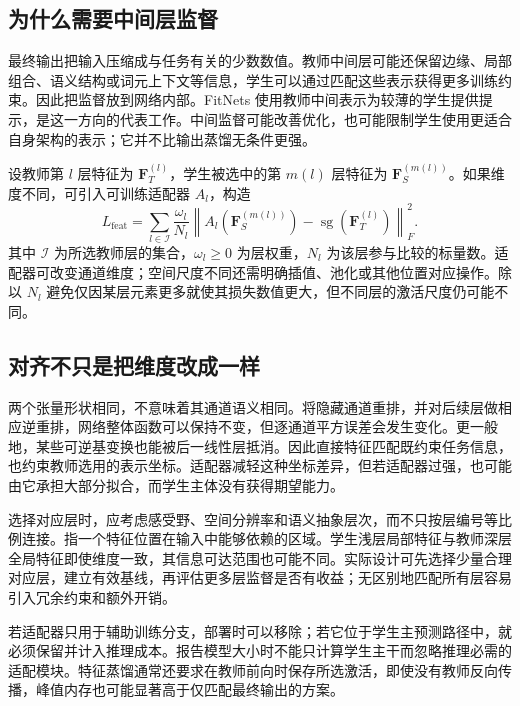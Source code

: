 \documentclass[UTF8,12pt,a4paper,fontset=fandol]{ctexart}
\begin{document}
\subsection{为什么需要中间层监督}
最终输出把输入压缩成与任务有关的少数数值。教师中间层可能还保留边缘、局部组合、语义结构或词元上下文等信息，学生可以通过匹配这些表示获得更多训练约束。因此把监督放到网络内部。FitNets 使用教师中间表示为较薄的学生提供提示，是这一方向的代表工作\cite{romero2015}。中间监督可能改善优化，也可能限制学生使用更适合自身架构的表示；它并不比输出蒸馏无条件更强。

设教师第 $l$ 层特征为 $\mathbf F_T^{(l)}$，学生被选中的第 $m(l)$ 层特征为 $\mathbf F_S^{(m(l))}$。如果维度不同，可引入可训练适配器 $A_l$，构造
\begin{equation}
 L_{\mathrm{feat}}=\sum_{l\in\mathcal I}\frac{\omega_l}{N_l}
 \left\|A_l(\mathbf F_S^{(m(l))})-
       \operatorname{sg}(\mathbf F_T^{(l)})\right\|_F^2.
 \label{eq:kd-feature-loss}
\end{equation}
其中 $\mathcal I$ 为所选教师层的集合，$\omega_l\geq0$ 为层权重，$N_l$ 为该层参与比较的标量数。适配器可改变通道维度；空间尺度不同还需明确插值、池化或其他位置对应操作。除以 $N_l$ 避免仅因某层元素更多就使其损失数值更大，但不同层的激活尺度仍可能不同。

\subsection{对齐不只是把维度改成一样}
两个张量形状相同，不意味着其通道语义相同。将隐藏通道重排，并对后续层做相应逆重排，网络整体函数可以保持不变，但逐通道平方误差会发生变化。更一般地，某些可逆基变换也能被后一线性层抵消。因此直接特征匹配既约束任务信息，也约束教师选用的表示坐标。适配器减轻这种坐标差异，但若适配器过强，也可能由它承担大部分拟合，而学生主体没有获得期望能力。

选择对应层时，应考虑感受野、空间分辨率和语义抽象层次，而不只按层编号等比例连接。指一个特征位置在输入中能够依赖的区域。学生浅层局部特征与教师深层全局特征即使维度一致，其信息可达范围也可能不同。实际设计可先选择少量合理对应层，建立有效基线，再评估更多层监督是否有收益；无区别地匹配所有层容易引入冗余约束和额外开销。

若适配器只用于辅助训练分支，部署时可以移除；若它位于学生主预测路径中，就必须保留并计入推理成本。报告模型大小时不能只计算学生主干而忽略推理必需的适配模块。特征蒸馏通常还要求在教师前向时保存所选激活，即使没有教师反向传播，峰值内存也可能显著高于仅匹配最终输出的方案。
\end{document}
